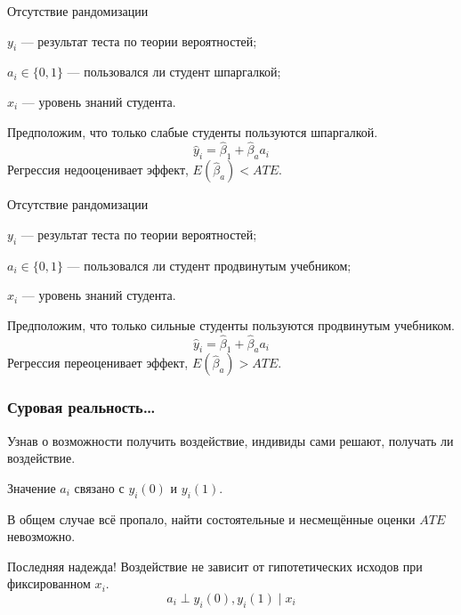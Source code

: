 \begin{frame}{Отсутствие рандомизации}

  $y_i$ — результат теста по теории вероятностей;

  $a_i \in \{0, 1\}$ — пользовался ли студент шпаргалкой;

  $x_i$ — уровень знаний студента. 
  
  \pause
  Предположим, что только слабые студенты пользуются шпаргалкой. 
  \pause
  \[
    \hat y_i = \hat \beta_1 + \hat \beta_a a_i
  \]
  Регрессия недооценивает эффект, $E(\hat \beta_a) < ATE$.
\end{frame}


\begin{frame}{Отсутствие рандомизации}

  $y_i$ — результат теста по теории вероятностей;

  $a_i \in \{0, 1\}$ — пользовался ли студент продвинутым учебником;

  $x_i$ — уровень знаний студента. 
  
  \pause
  Предположим, что только сильные студенты пользуются продвинутым учебником. 
  \pause
  \[
    \hat y_i = \hat \beta_1 + \hat \beta_a a_i
  \]
  Регрессия переоценивает эффект, $E(\hat \beta_a) > ATE$.
\end{frame}



\begin{frame}
  \frametitle{Суровая реальность\ldots}

  Узнав о возможности получить воздействие, \alert{индивиды сами решают}, получать ли воздействие. 
  
  
  Значение $a_i$ \alert{связано с} $y_i(0)$ и $y_i(1)$. 

  \pause 

  В общем случае всё пропало, найти состоятельные и несмещённые оценки $ATE$ невозможно. 

  \pause 

  \begin{block}{Последняя надежда!}
  Воздействие не зависит от гипотетических исходов при фиксированном $x_i$.
  \[
  a_i \perp y_i(0), y_i(1) \mid  x_i
  \]
  \end{block}

\end{frame}


